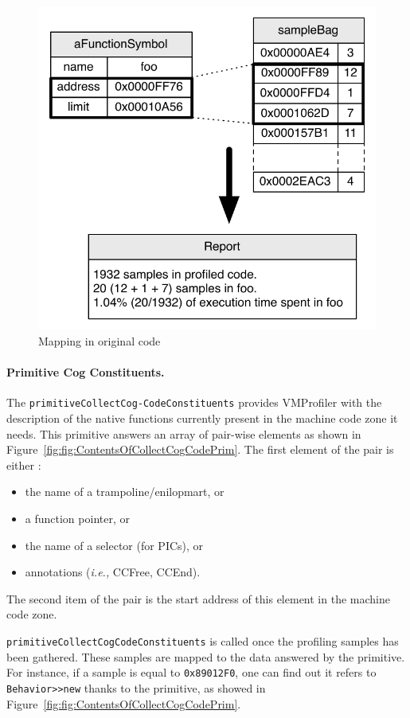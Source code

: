 \documentclass[10pt,nonatbib]{sigplanconf}
\newcommand{\ct}{\lstinline[backgroundcolor=\color{white},basicstyle=\small\ttfamily]}
\newcommand{\ie}{\emph{i.e.,}\xspace}
\newcommand{\figlabel}[1]{\label{fig:#1}}
\newcommand{\figref}[1]{Figure~\ref{fig:#1}}
\begin{document}
 \begin{figure}[t!]
     \begin{center}
         \includegraphics[width=0.85\linewidth]{OriginalMapping}
         \caption{Mapping in original code}
         \figlabel{fig:OriginalMapping}
     \end{center}
 \end{figure}
 
 \paragraph{Primitive Cog Constituents.}
The \ct{primitiveCollectCog-CodeConstituents} provides VMProfiler with the description of the native functions currently present in the machine code zone it needs. 
This primitive answers an array of pair-wise elements as shown in \figref{fig:ContentsOfCollectCogCodePrim}. The first element of the pair is either :
\begin{itemize}
	\item the name of a trampoline/enilopmart, or
	\item a function pointer, or
	\item the name of a selector (for PICs), or
	\item annotations (\ie CCFree, CCEnd).
\end{itemize}
The second item of the pair is the start address of this element in the machine code zone.

\ct{primitiveCollectCogCodeConstituents} is called once the profiling samples has been gathered. These samples are mapped to the data answered by the primitive. For instance, if a sample is equal to \ct{0x89012F0}, one can find out it refers to \ct{Behavior>>new} thanks to the primitive, as showed in \figref{fig:ContentsOfCollectCogCodePrim}.
\end{document}

